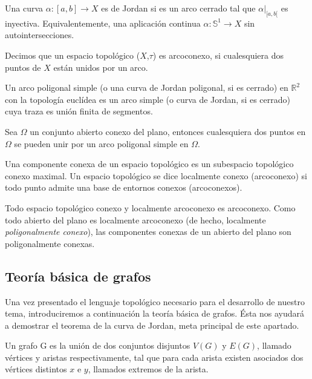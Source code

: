\begin{definition}
	Una curva $\alpha : [a,b] \rightarrow X$ es de Jordan si es un arco cerrado tal que $\alpha \vert_{[a,b[}$ es inyectiva. Equivalentemente, una aplicación continua $\alpha : \mathbb{S}^1 \rightarrow X$ sin autointersecciones.
\end{definition}

\begin{definition}
	Decimos que un espacio topológico ($X$,$\tau$) es arcoconexo, si cualesquiera dos puntos de $X$ están unidos por un arco.
\end{definition}

\begin{definition}
	Un arco poligonal simple (o una curva de Jordan poligonal, si es cerrado) en $\mathbb{R}^2$ con la topología euclídea es un arco simple (o curva de Jordan, si es cerrado) cuya traza es  unión finita de segmentos.
\end{definition}

\begin{lemma}
	Sea $\Omega$ un conjunto abierto conexo del plano, entonces cualesquiera dos puntos en $\Omega$ se pueden unir por un arco poligonal simple en $\Omega$. 
\end{lemma}

\begin{definition}
	Una componente conexa de un espacio topológico es un subespacio topológico conexo maximal. Un espacio topológico se dice localmente conexo (arcoconexo) si todo punto admite una base de entornos conexos (arcoconexos). 
\end{definition}
\begin{lemma}
Todo espacio topológico conexo y localmente arcoconexo es arcoconexo. Como todo abierto del plano es localmente arcoconexo (de hecho, localmente {\em poligonalmente conexo}), las componentes conexas de un abierto del plano son poligonalmente conexas. 
\end{lemma}

\subsection{Teoría básica de grafos}

Una vez presentado el lenguaje topológico necesario para el desarrollo de nuestro tema, introduciremos a continuación la teoría básica de grafos. Ésta nos ayudará a demostrar el teorema de la curva de Jordan, meta principal de este apartado.

\begin{definition}
	Un grafo G es la unión de dos conjuntos disjuntos $V(G)$ y $E(G)$, llamado vértices y aristas respectivamente, tal que para cada arista existen asociados dos vértices distintos $x$ e $y$, llamados extremos de la arista.
\end{definition}



